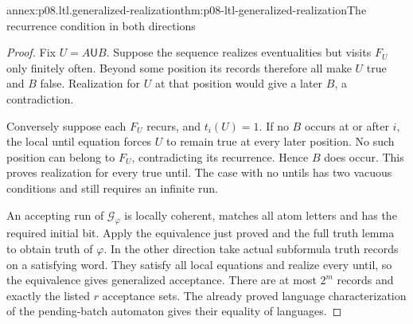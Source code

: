 \begin{annexitem}{annex:p08.ltl.generalized-realization}{thm:p08-ltl-generalized-realization}{The recurrence condition in both directions}
\begin{proof}
Fix \(U=A\mathbin{\mathsf U}B\). Suppose the sequence
realizes eventualities but visits \(F_U\) only finitely often.
Beyond some position its records therefore all make \(U\)
true and \(B\) false. Realization for \(U\) at that position
would give a later \(B\), a contradiction.

Conversely suppose each \(F_U\) recurs, and \(t_i(U)=1\).
If no \(B\) occurs at or after \(i\), the local until
equation forces \(U\) to remain true at every later position.
No such position can belong to \(F_U\), contradicting its
recurrence. Hence \(B\) does occur. This proves realization
for every true until. The case with no untils has two vacuous
conditions and still requires an infinite run.

An accepting run of \(\mathcal G_\varphi\) is locally
coherent, matches all atom letters and has the required initial
bit. Apply the equivalence just proved and the full truth lemma
to obtain truth of \(\varphi\). In the other direction take
actual subformula truth records on a satisfying word. They
satisfy all local equations and realize every until, so the
equivalence gives generalized acceptance. There are at most
\(2^m\) records and exactly the listed \(r\) acceptance
sets. The already proved language characterization of the
pending-batch automaton gives their equality of languages.
\end{proof}
\end{annexitem}

